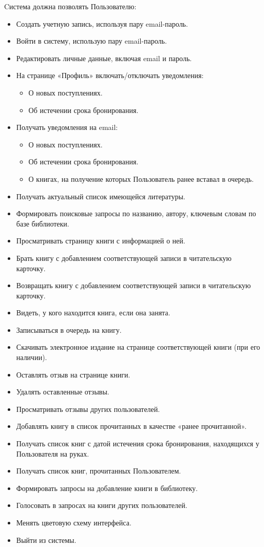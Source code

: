 \documentclass[../doc.tex]{subfiles}
\begin{document}
\par
Cистема должна позволять Пользователю:
\begin{itemize}
    \item Создать учетную запись, используя пару email-пароль.
    \item Войти в систему, использую пару email-пароль.
    \item Редактировать личные данные, включая email и пароль.
    \item На странице «Профиль» включать/отключать уведомления:
    \begin{itemize}
        \item О новых поступлениях.
        \item Об истечении срока бронирования.
    \end{itemize}
    \item Получать уведомления на email:
    \begin{itemize}
        \item О новых поступлениях.
        \item Об истечении срока бронирования.
        \item О книгах, на получение которых Пользователь ранее вставал в очередь.
    \end{itemize}
    \item Получать актуальный список имеющейся литературы.
    \item Формировать поисковые запросы по названию, автору, ключевым словам по базе библиотеки.
    \item Просматривать страницу книги с информацией о ней.
    \item Брать книгу с добавлением соответствующей записи в читательскую карточку.
    \item Возвращать книгу с добавлением соответствующей записи в читательскую карточку.
    \item Видеть, у кого находится книга, если она занята.
    \item Записываться в очередь на книгу.
    \item Скачивать электронное издание на странице соответствующей книги (при его наличии).
    \item Оставлять отзыв на странице книги.
    \item Удалять оставленные отзывы.
    \item Просматривать отзывы других пользователей.
    \item Добавлять книгу в список прочитанных в качестве «ранее прочитанной».
    \item Получать список книг с датой истечения срока бронирования, находящихся у Пользователя на руках.
    \item Получать список книг, прочитанных Пользователем. 
    \item Формировать запросы на добавление книги в библиотеку.
    \item Голосовать в запросах на книги других пользователей.
    \item Менять цветовую схему интерфейса.
    \item Выйти из системы.
\end{itemize}
\end{document}
